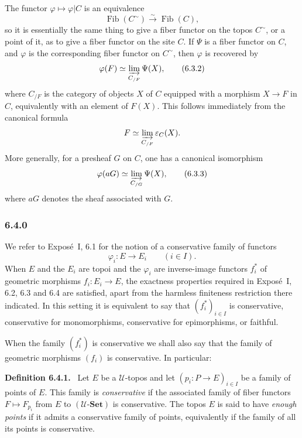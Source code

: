 \documentclass[11pt]{article}
\newcommand{\U}{\mathcal{U}}
\newcommand{\Set}{\mathbf{Set}}
\newcommand{\Ffib}{\operatorname{Fib}}
\newenvironment{statement}[1]{\par\medskip\noindent\textbf{#1.}\ }{\par\medskip}
\begin{document}
The functor \(\varphi\mapsto\varphi|C\) is an equivalence
\[
\Ffib(C^{\sim})\xrightarrow{\sim}\Ffib(C),
\]
so it is essentially the same thing to give a fiber functor on the topos \(C^{\sim}\), or a point of it, as to give a fiber functor on the site \(C\). If \(\Psi\) is a fiber functor on \(C\), and \(\varphi\) is the corresponding fiber functor on \(C^{\sim}\), then \(\varphi\) is recovered by
\begin{equation*}
\varphi(F)\simeq\varinjlim_{C_{/F}}\Psi(X),\tag{6.3.2}
\end{equation*}
where \(C_{/F}\) is the category of objects \(X\) of \(C\) equipped with a morphism \(X\to F\) in \(\widehat C\), equivalently with an element of \(F(X)\). This follows immediately from the canonical formula
\[
F\simeq\varinjlim_{C_{/F}}\varepsilon_C(X).
\]
More generally, for a presheaf \(G\) on \(C\), one has a canonical isomorphism
\begin{equation*}
\varphi(aG)\simeq\varinjlim_{C_{/G}}\Psi(X),\tag{6.3.3}
\end{equation*}
where \(aG\) denotes the sheaf associated with \(G\).

\subsubsection*{6.4.0}
We refer to Expos\'e~I, 6.1 for the notion of a conservative family of functors
\[
\varphi_i:E\longrightarrow E_i\qquad (i\in I).
\]
When \(E\) and the \(E_i\) are topoi and the \(\varphi_i\) are inverse-image functors \(f_i^*\) of geometric morphisms \(f_i:E_i\to E\), the exactness properties required in Expos\'e~I, 6.2, 6.3 and 6.4 are satisfied, apart from the harmless finiteness restriction there indicated. In this setting it is equivalent to say that \((f_i^*)_{i\in I}\) is conservative, conservative for monomorphisms, conservative for epimorphisms, or faithful.

When the family \((f_i^*)\) is conservative we shall also say that the family of geometric morphisms \((f_i)\) is conservative. In particular:

\begin{statement}{Definition 6.4.1}
Let \(E\) be a \(\U\)-topos and let \((p_i:P\to E)_{i\in I}\) be a family of points of \(E\). This family is \emph{conservative} if the associated family of fiber functors \(F\mapsto F_{p_i}\) from \(E\) to \((\U\text{-}\Set)\) is conservative. The topos \(E\) is said to have \emph{enough points} if it admits a conservative family of points, equivalently if the family of all its points is conservative.
\end{statement}
\end{document}
